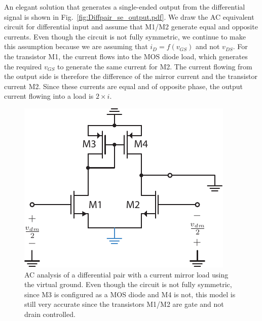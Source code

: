 An elegant solution that generates a single-ended output from the differential signal is shown in Fig.~\ref{fig:Diffpair_se_output.pdf}.  We draw the AC equivalent circuit for differential input and assume that M1/M2 generate equal and opposite currents.  Even though the circuit is not fully symmetric, we continue to make this assumption because we are assuming that $i_D = f(v_{GS})$ and not $v_{DS}$.  For the transistor M1, the current flows into the MOS diode load, which generates the required $v_{GS}$ to generate the same current for M2.  The current flowing from the output side is therefore the difference of the mirror current and the transistor current M2.  Since these currents are equal and of opposite phase, the output current flowing into a load is $2\times i$. 
\begin{figure}[tb]
\begin{center}
\includegraphics[scale=1]{Diffpair_se_ac_gm.pdf} 
\end{center}
\caption{AC analysis of a differential pair with a current mirror load using the virtual ground.  Even though the circuit is not fully symmetric, since M3 is configured as a MOS diode and M4 is not, this model is still very accurate since the transistors M1/M2 are gate and not drain controlled.} \label{fig:Diffpair_se_ac_gm.pdf}
\end{figure}

